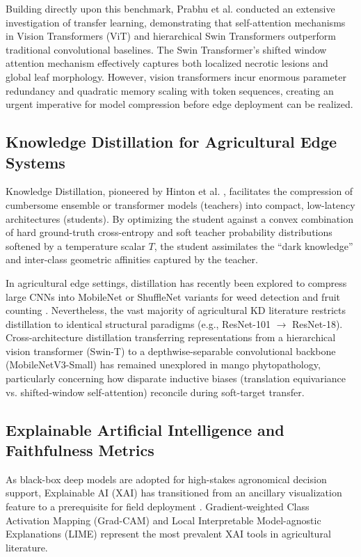 \documentclass[journal,10pt,twocolumn]{article}
\begin{document}
Building directly upon this benchmark, Prabhu et al. \cite{prabhu2025investigation} conducted an extensive investigation of transfer learning, demonstrating that self-attention mechanisms in Vision Transformers (ViT) and hierarchical Swin Transformers \cite{liu2021swin} outperform traditional convolutional baselines. The Swin Transformer's shifted window attention mechanism effectively captures both localized necrotic lesions and global leaf morphology. However, vision transformers incur enormous parameter redundancy and quadratic memory scaling with token sequences, creating an urgent imperative for model compression before edge deployment can be realized.

\subsection{Knowledge Distillation for Agricultural Edge Systems}
Knowledge Distillation, pioneered by Hinton et al. \cite{hinton2015distilling}, facilitates the compression of cumbersome ensemble or transformer models (teachers) into compact, low-latency architectures (students). By optimizing the student against a convex combination of hard ground-truth cross-entropy and soft teacher probability distributions softened by a temperature scalar $T$, the student assimilates the ``dark knowledge'' and inter-class geometric affinities captured by the teacher.

In agricultural edge settings, distillation has recently been explored to compress large CNNs into MobileNet or ShuffleNet variants for weed detection and fruit counting \cite{howard2019searching}. Nevertheless, the vast majority of agricultural KD literature restricts distillation to identical structural paradigms (e.g., ResNet-101 $\rightarrow$ ResNet-18). Cross-architecture distillation transferring representations from a hierarchical vision transformer (Swin-T) to a depthwise-separable convolutional backbone (MobileNetV3-Small) has remained unexplored in mango phytopathology, particularly concerning how disparate inductive biases (translation equivariance vs. shifted-window self-attention) reconcile during soft-target transfer.

\subsection{Explainable Artificial Intelligence and Faithfulness Metrics}
As black-box deep models are adopted for high-stakes agronomical decision support, Explainable AI (XAI) has transitioned from an ancillary visualization feature to a prerequisite for field deployment \cite{arrieta2020explainable}. Gradient-weighted Class Activation Mapping (Grad-CAM) \cite{selvaraju2017grad} and Local Interpretable Model-agnostic Explanations (LIME) \cite{ribeiro2016should} represent the most prevalent XAI tools in agricultural literature. 
\end{document}
